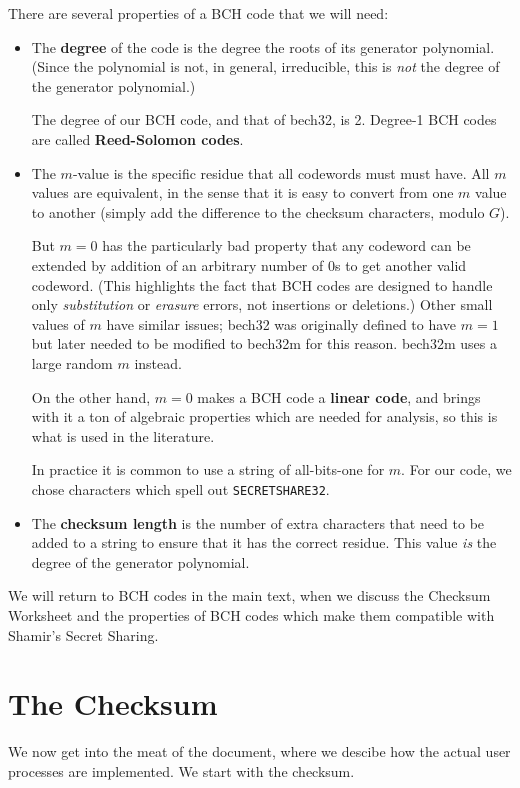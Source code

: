 \documentclass[letterpaper]{article}
\theoremstyle{xxx}
\theoremstyle{evil}
\theoremstyle{yyy}
\theoremstyle{plain}
\theoremstyle{zzz}
\begin{document}
There are several properties of a BCH code that we will need:
\begin{itemize}
\item The \textbf{degree} of the code is the degree the roots of its
generator polynomial. (Since the polynomial is not, in general, irreducible,
this is \emph{not} the degree of the generator polynomial.)

The degree of our BCH code, and that of bech32, is 2. Degree-1 BCH codes are
called \textbf{Reed-Solomon codes}.
\item The $m$-value is the specific residue that all codewords must 
must have. All $m$ values are equivalent, in the sense that it is easy
to convert from one $m$ value to another (simply add the difference to
the checksum characters, modulo $G$).

But $m=0$ has the particularly bad property that any codeword can be extended
by addition of an arbitrary number of 0s to get another valid codeword. (This
highlights the fact that BCH codes are designed to handle only \emph{substitution}
or \emph{erasure} errors, not insertions or deletions.) Other small values of
$m$ have similar issues; bech32 was originally defined to have $m=1$ but later
needed to be modified to bech32m for this reason. bech32m uses a large random
$m$ instead.

On the other hand, $m=0$ makes a BCH code a \textbf{linear code}, and brings
with it a ton of algebraic properties which are needed for analysis, so this
is what is used in the literature.

In practice it is common to use a string of all-bits-one for $m$. For our code,
we chose characters which spell out \texttt{SECRETSHARE32}.

\item The \textbf{checksum length} is the number of extra characters that
need to be added to a string to ensure that it has the correct residue.
This value \emph{is} the degree of the generator polynomial.
\end{itemize}

We will return to BCH codes in the main text, when we discuss the Checksum
Worksheet and the properties of BCH codes which make them compatible with
Shamir's Secret Sharing.

\section{The Checksum}

We now get into the meat of the document, where we descibe how the actual
user processes are implemented. We start with the checksum.
\end{document}
